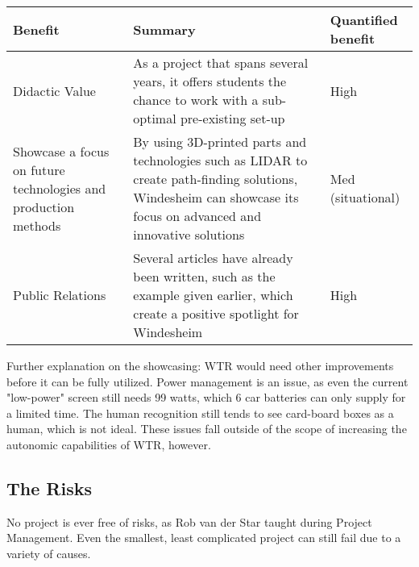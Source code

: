 \begin{tabular}{|L{6cm}|L{6cm}|l|}
\hline
Benefit & Summary & Quantified benefit \\ \hline
Didactic Value & As a project that spans several years, it offers students the chance to work with a sub-optimal pre-existing set-up & High \\ \hline
Showcase a focus on future technologies and production methods & By using 3D-printed parts and technologies such as LIDAR to create path-finding solutions, Windesheim can showcase its focus on advanced and innovative solutions & Med (situational) \\ \hline
Public Relations & Several articles have already been written, such as the example given earlier, which create a positive spotlight for Windesheim & High \\ \hline
\end{tabular}

Further explanation on the showcasing: WTR would need other improvements before it can be fully utilized.
Power management is an issue, as even the current "low-power" screen still needs 99 watts, which 6 car batteries can only supply for a limited time.
The human recognition still tends to see card-board boxes as a human, which is not ideal.
These issues fall outside of the scope of increasing the autonomic capabilities of WTR, however.


\subsection{The Risks}
No project is ever free of risks, as Rob van der Star taught during Project Management.
Even the smallest, least complicated project can still fail due to a variety of causes.

